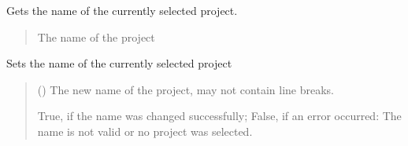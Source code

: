 \documentclass[letterpaper,10pt,english]{sphinxmanual}
\begin{document}
\begin{fulllineitems}
\begin{fulllineitems}
\label{\detokenize{apidoc/src.osm_configurator.control:src.osm_configurator.control.control_interface.IControl.get_project_name}}
\pysigstartsignatures
{}
\pysigstopsignatures
\sphinxAtStartPar
Gets the name of the currently selected project.
\begin{quote}\begin{description}
\sphinxAtStartPar
The name of the project

\sphinxAtStartPar
{}

\end{description}\end{quote}

\end{fulllineitems}


\begin{fulllineitems}
\label{\detokenize{apidoc/src.osm_configurator.control:src.osm_configurator.control.control_interface.IControl.set_project_name}}
\pysigstartsignatures
{}
\pysigstopsignatures
\sphinxAtStartPar
Sets the name of the currently selected project
\begin{quote}\begin{description}
\sphinxAtStartPar
{} () \textendash{} The new name of the project, may not contain line breaks.

\sphinxAtStartPar
True, if the name was changed successfully; False, if an error occurred: The name is not valid or no project was selected.

\sphinxAtStartPar
{}

\end{description}\end{quote}


\end{fulllineitems}
\end{fulllineitems}
\end{document}
